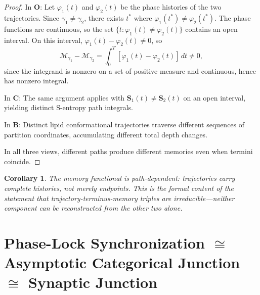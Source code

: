 \documentclass[twocolumn,10pt]{article}
\newtheorem{corollary}[theorem]{Corollary}
\theoremstyle{remark}
\newcommand{\Scoord}{\mathbf{S}}
\newcommand{\CatO}{\mathbf{O}}
\newcommand{\CatC}{\mathbf{C}}
\newcommand{\CatB}{\mathbf{B}}
\begin{document}
\begin{proof}
In $\CatO$: Let $\varphi_1(t)$ and $\varphi_2(t)$ be the phase histories of the two trajectories.
Since $\gamma_1 \neq \gamma_2$, there exists $t^*$ where $\varphi_1(t^*) \neq \varphi_2(t^*)$.
The phase functions are continuous, so the set $\{t : \varphi_1(t) \neq \varphi_2(t)\}$ contains an open interval.
On this interval, $\varphi_1(t) - \varphi_2(t) \neq 0$, so
\begin{equation}
\mathcal{M}_{\gamma_1} - \mathcal{M}_{\gamma_2} = \int_0^T [\varphi_1(t) - \varphi_2(t)]\,dt \neq 0,
\end{equation}
since the integrand is nonzero on a set of positive measure and continuous, hence has nonzero integral.

In $\CatC$: The same argument applies with $\Scoord_1(t) \neq \Scoord_2(t)$ on an open interval, yielding distinct S-entropy path integrals.

In $\CatB$: Distinct lipid conformational trajectories traverse different sequences of partition coordinates, accumulating different total depth changes.

In all three views, different paths produce different memories even when termini coincide.
\end{proof}

\begin{corollary}
The memory functional is path-dependent: trajectories carry complete histories, not merely endpoints.
This is the formal content of the statement that trajectory-terminus-memory triples are irreducible---neither component can be reconstructed from the other two alone.
\end{corollary}

\section{\texorpdfstring{Phase-Lock Synchronization $\cong$ Asymptotic Categorical Junction $\cong$ Synaptic Junction}{Phase-Lock Synchronization = Asymptotic Categorical Junction = Synaptic Junction}}
\label{sec:junction}
\end{document}
